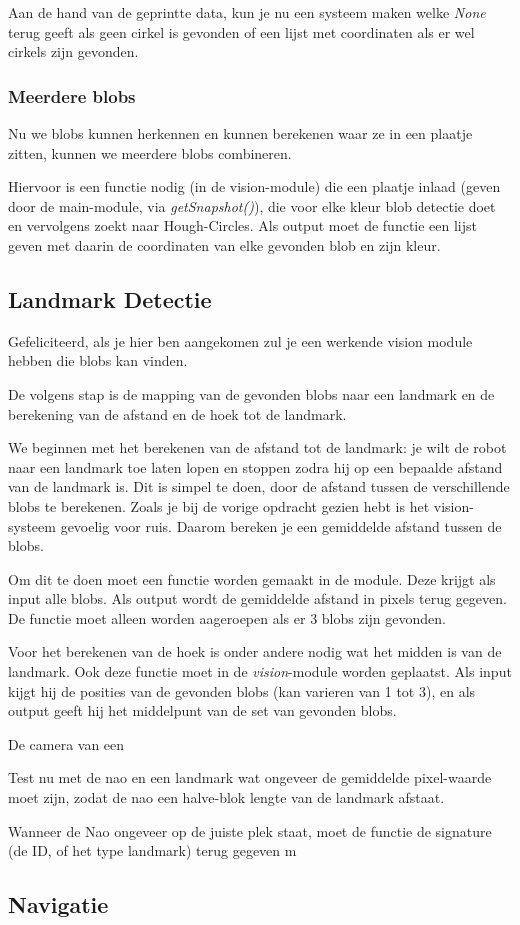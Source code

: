 \documentclass[a4paper]{article}
\begin{document}
Aan de hand van de geprintte data, kun je nu een systeem maken welke \textit{None} terug geeft als geen cirkel is gevonden of een lijst met coordinaten als er wel cirkels zijn gevonden.

\subsubsection{Meerdere blobs}
Nu we blobs kunnen herkennen en kunnen berekenen waar ze in een plaatje zitten, kunnen we meerdere blobs combineren.

Hiervoor is een functie nodig (in de vision-module) die een plaatje inlaad (geven door de main-module, via \textit{getSnapshot()}), die voor elke kleur blob detectie doet en vervolgens zoekt  naar Hough-Circles. Als output moet de functie een lijst geven met daarin de coordinaten van elke gevonden blob en zijn kleur.

\subsection{Landmark Detectie}
Gefeliciteerd, als je hier ben aangekomen zul je een werkende vision module hebben die blobs kan vinden.

De volgens stap is de mapping van de gevonden blobs naar een landmark en de berekening van de afstand en de hoek tot de landmark.

We beginnen met het berekenen van de afstand tot de landmark: je wilt de robot naar een landmark toe laten lopen en stoppen zodra hij op een bepaalde afstand van de landmark is. Dit is simpel te doen, door de afstand tussen de verschillende blobs te berekenen. Zoals je bij de vorige opdracht gezien hebt is het vision-systeem gevoelig voor ruis. Daarom bereken je een gemiddelde afstand tussen de blobs. 

Om dit te doen moet een functie worden gemaakt in de  module. Deze krijgt als input alle blobs. Als output wordt de gemiddelde afstand in pixels terug gegeven. De functie moet alleen worden aageroepen als er 3 blobs zijn gevonden.

Voor het berekenen van de hoek is onder andere nodig wat het midden is van de landmark. Ook deze functie moet in de \textit{vision}-module worden geplaatst. Als input kijgt hij de posities van de gevonden blobs (kan varieren van 1 tot 3), en als output geeft hij het middelpunt van de set van gevonden blobs. 

De camera van een 





Test nu met de nao en een landmark wat ongeveer de gemiddelde pixel-waarde moet zijn, zodat de nao een halve-blok lengte van de landmark afstaat.

Wanneer de Nao ongeveer op de juiste plek staat, moet de functie de signature (de ID, of het type landmark) terug gegeven m








\subsection{Navigatie}
\end{document}
